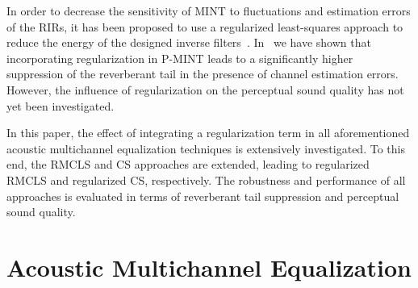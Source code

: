 \documentclass{article}
\begin{document}
In order to decrease the sensitivity of MINT to fluctuations and estimation errors of the RIRs, it has been proposed to use a regularized least-squares approach to reduce the energy of the designed inverse filters~\cite{Hikichi_EURASIP_2007}.
In~\cite{Kodrasi_ICASSP_2012} we have shown that incorporating regularization in P-MINT leads to a significantly higher suppression of the reverberant tail in the presence of channel estimation errors.
However, the influence of regularization on the perceptual sound quality has not yet been investigated.

In this paper, the effect of integrating a regularization term in all aforementioned acoustic multichannel equalization techniques is extensively investigated.
To this end, the RMCLS and CS approaches are extended, leading to regularized RMCLS and regularized CS, respectively.
The robustness and performance of all approaches is evaluated in terms of reverberant tail suppression and perceptual sound quality.
\vspace{-0.1cm}
\section{Acoustic Multichannel Equalization}
\vspace{-0.2cm}
\end{document}
